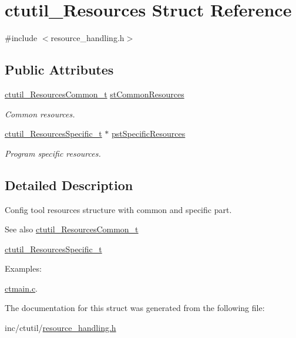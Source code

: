 \hypertarget{structctutil__Resources}{}\section{ctutil\+\_\+\+Resources Struct Reference}
\label{structctutil__Resources}


{\ttfamily \#include $<$resource\+\_\+handling.\+h$>$}

\subsection*{Public Attributes}
\begin{DoxyCompactItemize}
\item 
\hypertarget{structctutil__Resources_abd3744f69acce6e0cc60a44867c5fcab}{}\label{structctutil__Resources_abd3744f69acce6e0cc60a44867c5fcab} 
\hyperlink{resource__handling_8h_a33ab0d580557807ced1b0ca3bd3a3cf0}{ctutil\+\_\+\+Resources\+Common\+\_\+t} \hyperlink{structctutil__Resources_abd3744f69acce6e0cc60a44867c5fcab}{st\+Common\+Resources}
\begin{DoxyCompactList}\small\item\em Common resources. \end{DoxyCompactList}\item 
\hypertarget{structctutil__Resources_afb9d920f3817b708c08768fc9e04cfa9}{}\label{structctutil__Resources_afb9d920f3817b708c08768fc9e04cfa9} 
\hyperlink{resource__handling_8h_a19efb53c32f9b0e36d22639f6855b502}{ctutil\+\_\+\+Resources\+Specific\+\_\+t} $\ast$ \hyperlink{structctutil__Resources_afb9d920f3817b708c08768fc9e04cfa9}{pst\+Specific\+Resources}
\begin{DoxyCompactList}\small\item\em Program specific resources. \end{DoxyCompactList}\end{DoxyCompactItemize}


\subsection{Detailed Description}
Config tool resources structure with common and specific part. \begin{DoxySeeAlso}{See also}
\hyperlink{resource__handling_8h_a33ab0d580557807ced1b0ca3bd3a3cf0}{ctutil\+\_\+\+Resources\+Common\+\_\+t} 

\hyperlink{resource__handling_8h_a19efb53c32f9b0e36d22639f6855b502}{ctutil\+\_\+\+Resources\+Specific\+\_\+t} 
\end{DoxySeeAlso}
\begin{Desc}
\item[Examples\+: ]\par
\hyperlink{ctmain_8c-example}{ctmain.\+c}.\end{Desc}


The documentation for this struct was generated from the following file\+:\begin{DoxyCompactItemize}
\item 
inc/ctutil/\hyperlink{resource__handling_8h}{resource\+\_\+handling.\+h}\end{DoxyCompactItemize}
